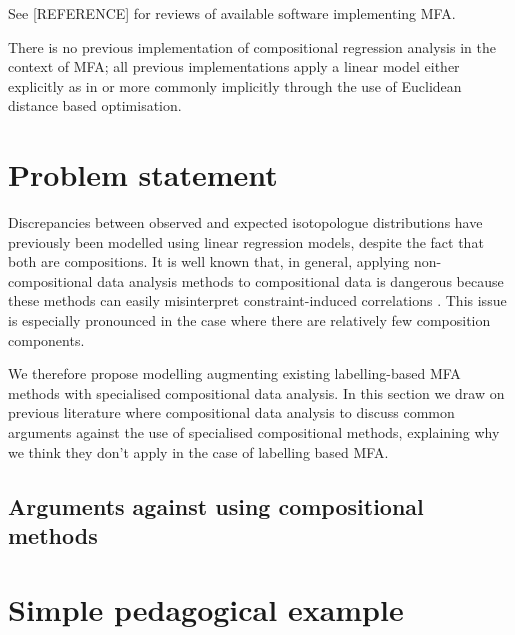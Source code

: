 \documentclass{article}
\begin{document}
See {[}REFERENCE{]} for reviews of available software implementing MFA.

There is no previous implementation of compositional regression analysis
in the context of MFA; all previous implementations apply a linear model
either explicitly as in \citep[Eq. 3]{theorellBeCertainUncertainty2017}
or more commonly implicitly through the use of Euclidean distance based
optimisation.

\section{Problem statement}\label{problem-statement}

Discrepancies between observed and expected isotopologue distributions
have previously been modelled using linear regression models, despite
the fact that both are compositions. It is well known that, in general,
applying non-compositional data analysis methods to compositional data
is dangerous because these methods can easily misinterpret
constraint-induced correlations \citep[Ch.
3]{aitchisonjStatisticalAnalysisCompositional}. This issue is especially
pronounced in the case where there are relatively few composition
components.

We therefore propose modelling augmenting existing labelling-based MFA
methods with specialised compositional data analysis. In this section we
draw on previous literature where compositional data analysis to discuss
common arguments against the use of specialised compositional methods,
explaining why we think they don't apply in the case of labelling based
MFA.

\subsection{Arguments against using compositional
methods}\label{arguments-against-using-compositional-methods}

\section{Simple pedagogical example}\label{simple-pedagogical-example}




\end{document}

